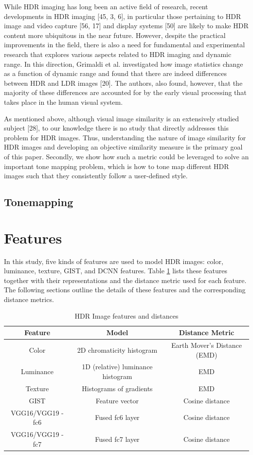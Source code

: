 While HDR imaging has long been an active field of research, recent developments in HDR imaging [45, 3, 6], in particular those pertaining to HDR image and video capture [56, 17] and display systems [50] are likely to make HDR content more ubiquitous in the near future. However, despite the practical improvements in the field, there is also a need for fundamental and experimental research that explores various aspects related to HDR imaging and dynamic range. In this direction, Grimaldi et al. investigated how image statistics change as a function of dynamic range and found that there are indeed differences between HDR and LDR images [20]. The authors, also found, however, that the majority of these differences are accounted for by the early visual processing that takes place in the human visual system.

As mentioned above, although visual image similarity is an extensively studied subject [28], to our knowledge there is no study that directly addresses this problem for HDR images. Thus, understanding the nature of image similarity for HDR images and developing an objective similarity measure is the primary goal of this paper. Secondly, we show how such a metric could be leveraged to solve an important tone mapping problem,
which is how to tone map different HDR images such that they consistently follow a user-defined style.

\subsection{Tonemapping}

\section{Features}
In this study, five kinds of features are used to model HDR images: color, luminance, texture, GIST, and DCNN features. Table \ref{tab:table_feature} lists these features together with their representations and the distance metric used for each feature. The following sections outline the details of these features and the corresponding distance metrics.

\begin{table}[h!]
\caption{HDR Image features and distances}
\centering
\begin{tabular}{c|c|c}
\label{tab:table_feature}
\textbf{Feature} & \textbf{Model} & \textbf{Distance Metric}\\
\hline
Color  & 2D chromaticity histogram & Earth Mover's Distance (EMD) \\
Luminance  & 1D (relative) luminance histogram & EMD \\
Texture  & Histograms of gradients & EMD \\
GIST  & Feature vector & Cosine distance \\
VGG16/VGG19 - fc6 & Fused fc6 layer & Cosine distance  \\
VGG16/VGG19 - fc7 & Fused fc7 layer & Cosine distance
\end{tabular}
\end{table}

